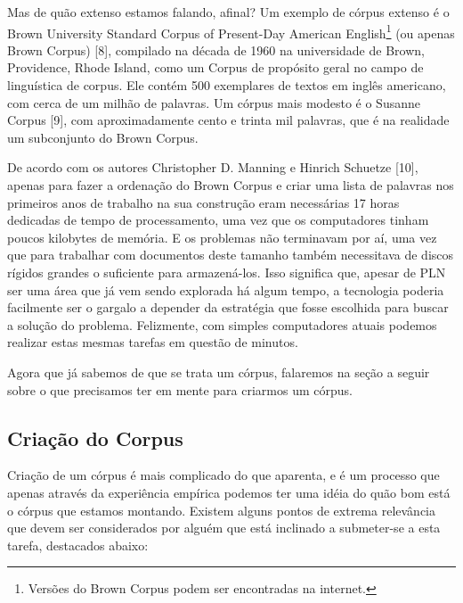 \documentclass[11pt]{report}
\begin{document}
Mas de quão extenso estamos falando, afinal? Um exemplo de córpus extenso é o Brown University Standard Corpus of Present-Day American English\footnote[1]{
Versões do Brown Corpus podem ser encontradas na internet.} (ou apenas Brown Corpus) [8], compilado na década de 1960 na universidade de Brown, Providence, Rhode Island, como um Corpus de
propósito geral no campo de linguística de corpus. Ele contém 500 exemplares de textos em inglês americano, com cerca de um milhão de palavras. Um córpus mais modesto é o Susanne Corpus [9],
com aproximadamente cento e trinta mil palavras, que é na realidade um subconjunto do Brown Corpus.

De acordo com os autores Christopher D. Manning e Hinrich Schuetze [10], apenas para fazer a ordenação do Brown Corpus e criar uma lista de palavras nos primeiros anos de trabalho na
sua construção eram necessárias 17 horas dedicadas de tempo de processamento, uma vez que os computadores tinham poucos kilobytes de memória. E os problemas não terminavam por aí,
uma vez que para trabalhar com documentos deste tamanho também necessitava de discos rígidos grandes o suficiente para armazená-los. Isso significa que, apesar de PLN ser uma área
que já vem sendo explorada há algum tempo, a tecnologia poderia facilmente ser o gargalo a depender da estratégia que fosse escolhida para buscar a solução do problema. Felizmente,
com simples computadores atuais podemos realizar estas mesmas tarefas em questão de minutos.

Agora que já sabemos de que se trata um córpus, falaremos na seção a seguir sobre o que precisamos ter em mente para criarmos um córpus.

\subsection{Criação do Corpus}

\indent\indent Criação de um córpus é mais complicado do que aparenta, e é um processo que apenas através da experiência empírica podemos ter uma idéia do
quão bom está o córpus que estamos montando. Existem alguns pontos de extrema relevância que devem ser considerados por alguém que está inclinado a submeter-se a esta
tarefa, destacados abaixo:
\end{document}
